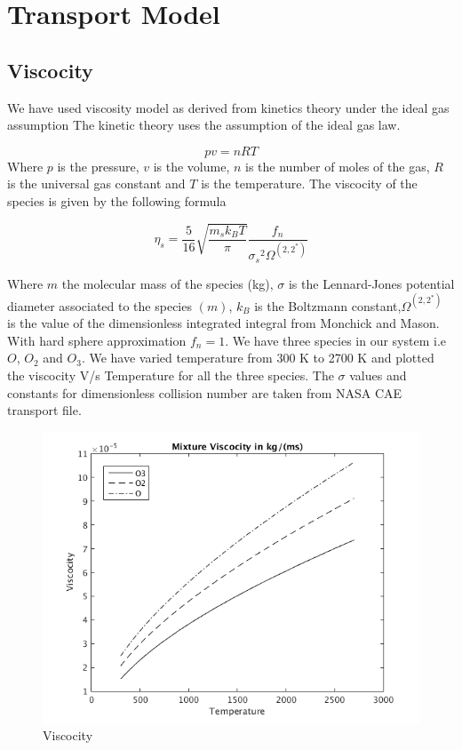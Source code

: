  \bigskip
 
\section{Transport Model}
\subsection{Viscocity}
\noindent We have used viscosity model as derived from kinetics theory under the ideal gas assumption
The kinetic theory uses the assumption of the ideal gas law.
 
$$pv = nRT$$ Where $p$ is the pressure, $v$ is the volume, $n$ is the number of moles of the gas, $R$ is the universal gas constant and $T$ is the temperature. The viscocity of the species is given by the following formula

$$\eta_s = \frac{5}{16}\sqrt{\frac{m_s k_B T}{\pi}}\frac{f_n}{{\sigma_s}^2   \Omega^{(2,2^*)}}$$

\noindent Where  $m$ the molecular mass of the species (kg), $\sigma$ is the Lennard-Jones potential diameter associated
to the species $(m)$, $k_B$ is the Boltzmann constant,$\Omega^{(2,2^*)}$ is the value of the dimensionless integrated integral from Monchick
and Mason\cite{Monchick}. With hard sphere approximation $f_n = 1$. We have three species in our system i.e $O$, $O_2$ and $O_3$. We have varied temperature from 300 K to 2700 K and plotted the viscocity V/s Temperature for all the three species. The $\sigma$ values and constants for dimensionless collision number are taken from NASA CAE transport file. 
\begin{figure}[H]
  \centering
  \includegraphics[scale=0.5]{figs/viscocity model.png}
   \caption{Viscocity}
\end{figure}

